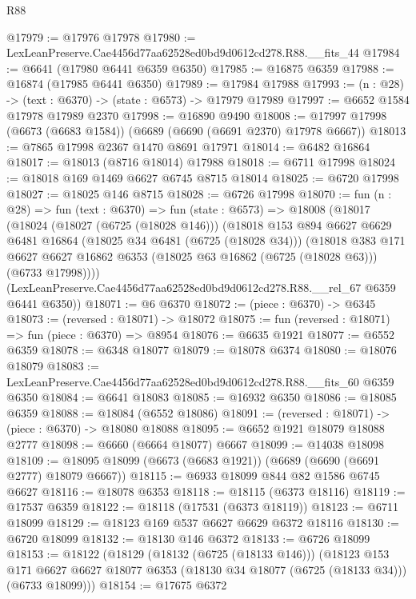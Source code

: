 \begin{lexlean}{R88}
\begin{coremodule}
@17979 := @17976 @17978
@17980 := LexLeanPreserve.Cae4456d77aa62528ed0bd9d0612cd278.R88.__fits_44
@17984 := @6641 (@17980 @6441 @6359 @6350)
@17985 := @16875 @6359
@17988 := @16874 (@17985 @6441 @6350)
@17989 := @17984 @17988
@17993 := (n : @28) -> (text : @6370) -> (state : @6573) -> @17979 @17989
@17997 := @6652 @1584 @17978 @17989 @2370
@17998 := @16890 @9490
@18008 := @17997 @17998 (@6673 (@6683 @1584)) (@6689 (@6690 (@6691 @2370) @17978 @6667))
@18013 := @7865 @17998 @2367 @1470 @8691 @17971
@18014 := @6482 @16864
@18017 := @18013 (@8716 @18014) @17988
@18018 := @6711 @17998
@18024 := @18018 @169 @1469 @6627 @6745 @8715 @18014
@18025 := @6720 @17998
@18027 := @18025 @146 @8715
@18028 := @6726 @17998
@18070 := fun (n : @28) =>
  fun (text : @6370) =>
  fun (state : @6573) =>
  @18008
    (@18017
      (@18024
        (@18027 (@6725 (@18028 @146)))
        (@18018
          @153
          @894
          @6627
          @6629
          @6481
          @16864
          (@18025 @34 @6481 (@6725 (@18028 @34)))
          (@18018
            @383
            @171
            @6627
            @6627
            @16862
            @6353
            (@18025 @63 @16862 (@6725 (@18028 @63)))
            (@6733 @17998))))
      (LexLeanPreserve.Cae4456d77aa62528ed0bd9d0612cd278.R88.__rel_67 @6359 @6441 @6350))
@18071 := @6 @6370
@18072 := (piece : @6370) -> @6345
@18073 := (reversed : @18071) -> @18072
@18075 := fun (reversed : @18071) => fun (piece : @6370) => @8954
@18076 := @6635 @1921
@18077 := @6552 @6359
@18078 := @6348 @18077
@18079 := @18078 @6374
@18080 := @18076 @18079
@18083 := LexLeanPreserve.Cae4456d77aa62528ed0bd9d0612cd278.R88.__fits_60 @6359 @6350
@18084 := @6641 @18083
@18085 := @16932 @6350
@18086 := @18085 @6359
@18088 := @18084 (@6552 @18086)
@18091 := (reversed : @18071) -> (piece : @6370) -> @18080 @18088
@18095 := @6652 @1921 @18079 @18088 @2777
@18098 := @6660 (@6664 @18077) @6667
@18099 := @14038 @18098
@18109 := @18095 @18099 (@6673 (@6683 @1921)) (@6689 (@6690 (@6691 @2777) @18079 @6667))
@18115 := @6933 @18099 @844 @82 @1586 @6745 @6627
@18116 := @18078 @6353
@18118 := @18115 (@6373 @18116)
@18119 := @17537 @6359
@18122 := @18118 (@17531 (@6373 @18119))
@18123 := @6711 @18099
@18129 := @18123 @169 @537 @6627 @6629 @6372 @18116
@18130 := @6720 @18099
@18132 := @18130 @146 @6372
@18133 := @6726 @18099
@18153 := @18122
    (@18129
      (@18132 (@6725 (@18133 @146)))
      (@18123
        @153
        @171
        @6627
        @6627
        @18077
        @6353
        (@18130 @34 @18077 (@6725 (@18133 @34)))
        (@6733 @18099)))
@18154 := @17675 @6372

\end{coremodule}
\end{lexlean}
